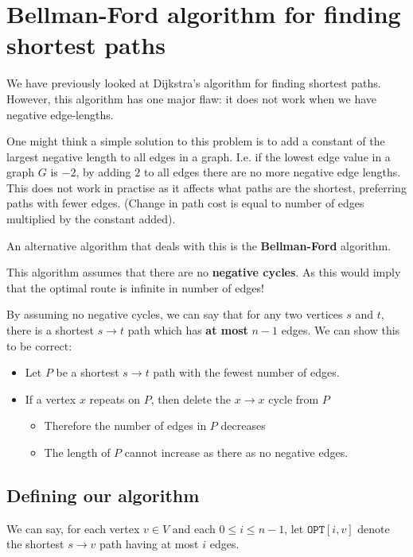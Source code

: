 \documentclass{article}
\begin{document}
\section{Bellman-Ford algorithm for finding shortest paths}

We have previously looked at Dijkstra's algorithm for finding shortest paths. However, this algorithm has one major flaw: it does not work when we have negative edge-lengths.

One might think a simple solution to this problem is to add a constant of the largest negative length to all edges in a graph. I.e. if the lowest edge value in a graph $G$ is $-2$, by adding $2$ to all edges there are no more negative edge lengths. This does not work in practise as it affects what paths are the shortest, preferring paths with fewer edges. (Change in path cost is equal to number of edges multiplied by the constant added).

An alternative algorithm that deals with this is the \textbf{Bellman-Ford} algorithm.

This algorithm assumes that there are no \textbf{negative cycles}. As this would imply that the optimal route is infinite in number of edges!

By assuming no negative cycles, we can say that for any two vertices $s$ and $t$, there is a shortest $s \rightarrow t$ path which has \textbf{at most} $n-1$ edges. We can show this to be correct:

\begin{itemize}
  \item Let $P$ be a shortest $s \rightarrow t$ path with the fewest number of edges.
  \item If a vertex $x$ repeats on $P$, then delete the $x\rightarrow x$ cycle from $P$
        \begin{itemize}
          \item Therefore the number of edges in $P$ decreases
          \item The length of $P$ cannot increase as there as no negative edges.
        \end{itemize}
\end{itemize}

\subsection{Defining our algorithm}

We can say, for each vertex $v \in V$ and each $0 \leq i \leq n-1$, let $\texttt{OPT} [i,v]$ denote the shortest $s \rightarrow v$ path having at most $i$ edges.
\end{document}
